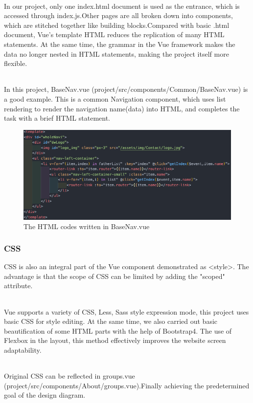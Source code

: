 \documentclass{article}
\begin{document}
~\\
\noindent
In our project, only one index.html document is used as the entrance, which is 
accessed through index.js.Other pages are all broken down into components, 
which are stitched together like building blocks.Compared with basic .html 
document, Vue's template HTML reduces the replication of many HTML statements. 
At the same time, the grammar in the Vue framework makes the data no longer 
nested in HTML statements, making the project itself more flexible.

~\\
\noindent
In this project, BaseNav.vue (project/src/components/Common/BaseNav.vue) 
is a good example. This is a common Navigation component, which uses list 
rendering to render the navigation name(data) into HTML, and completes 
the task with a brief HTML statement.

\begin{figure}[h]
    \centering
    \includegraphics[width=13cm]{img/exp/html.png}
    \caption{The HTML codes written in BaseNav.vue}
    \label{}
\end{figure}
\subsubsection{CSS}
CSS is also an integral part of the Vue component demonstrated 
as \textless style\textgreater. The advantage is that the scope of CSS can be 
limited by adding the "scoped" attribute.

~\\
\noindent
Vue supports a variety of CSS, Less, Sass style expression mode, 
this project uses basic CSS for style editing. At the same time, 
we also carried out basic beautification of some HTML parts with 
the help of Bootstrap4. The use of Flexbox in the layout, 
this method effectively improves the website screen adaptability.

~\\
\noindent
Original CSS  can be reflected in groups.vue 
(project/src/components/About/groups.vue).Finally achieving the 
predetermined goal of the design diagram.
\end{document}
